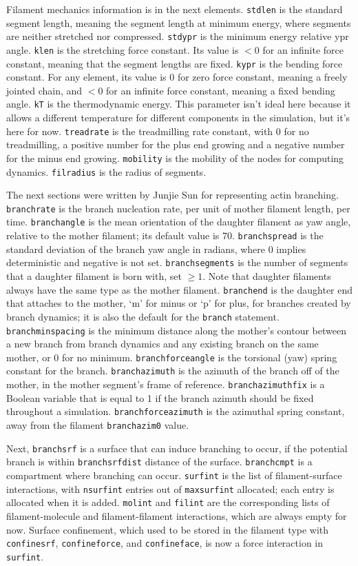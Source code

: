 \documentclass {scrbook}
\newcommand {\ttt} {\texttt}
\begin{document}
Filament mechanics information is in the next elements. \ttt{stdlen} is the standard segment length, meaning the segment length at minimum energy, where segments are neither stretched nor compressed. \ttt{stdypr} is the minimum energy relative ypr angle. \ttt{klen} is the stretching force constant. Its value is $< 0$ for an infinite force constant, meaning that the segment lengths are fixed. \ttt{kypr} is the bending force constant. For any element, its value is 0 for zero force constant, meaning a freely jointed chain, and $< 0$ for an infinite force constant, meaning a fixed bending angle. \ttt{kT} is the thermodynamic energy. This parameter isn't ideal here because it allows a different temperature for different components in the simulation, but it's here for now. \ttt{treadrate} is the treadmilling rate constant, with 0 for no treadmilling, a positive number for the plus end growing and a negative number for the minus end growing. \ttt{mobility} is the mobility of the nodes for computing dynamics. \ttt{filradius} is the radius of segments.

The next sections were written by Junjie Sun for representing actin branching. \ttt{branchrate} is the branch nucleation rate, per unit of mother filament length, per time. \ttt{branchangle} is the mean orientation of the daughter filament as yaw angle, relative to the mother filament; its default value is 70\degree. \ttt{branchspread} is the standard deviation of the branch yaw angle in radians, where 0 implies deterministic and negative is not set. \ttt{branchsegments} is the number of segments that a daughter filament is born with, set $\geq 1$. Note that daughter filaments always have the same type as the mother filament. \ttt{branchend} is the daughter end that attaches to the mother, `m' for minus or `p' for plus, for branches created by branch dynamics; it is also the default for the \ttt{branch} statement. \ttt{branchminspacing} is the minimum distance along the mother's contour between a new branch from branch dynamics and any existing branch on the same mother, or 0 for no minimum. \ttt{branchforceangle} is the torsional (yaw) spring constant for the branch. \ttt{branchazimuth} is the azimuth of the branch off of the mother, in the mother segment's frame of reference. \ttt{branchazimuthfix} is a Boolean variable that is equal to 1 if the branch azimuth should be fixed throughout a simulation. \ttt{branchforceazimuth} is the azimuthal spring constant, away from the filament \ttt{branchazim0} value.

Next, \ttt{branchsrf} is a surface that can induce branching to occur, if the potential branch is within \ttt{branchsrfdist} distance of the surface. \ttt{branchcmpt} is a compartment where branching can occur. \ttt{surfint} is the list of filament-surface interactions, with \ttt{nsurfint} entries out of \ttt{maxsurfint} allocated; each entry is allocated when it is added. \ttt{molint} and \ttt{filint} are the corresponding lists of filament-molecule and filament-filament interactions, which are always empty for now. Surface confinement, which used to be stored in the filament type with \ttt{confinesrf}, \ttt{confineforce}, and \ttt{confineface}, is now a force interaction in \ttt{surfint}.
\end{document}
